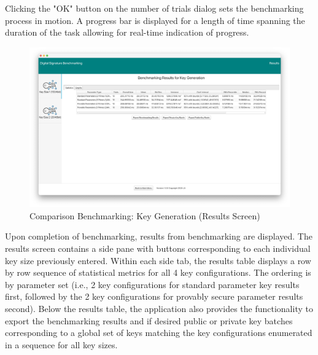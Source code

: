 \documentclass[]{final_report}
\begin{document}
Clicking the "OK" button on the number of trials dialog sets the benchmarking process in motion. A progress bar is displayed for a length of time spanning the duration of the task allowing for real-time indication of progress.


\begin{figure}[H]
    \centering
    \includegraphics[scale= 0.325]{main_pictures/ui/keyGen/keyGen4.png}
   \caption{Comparison Benchmarking: Key Generation (Results Screen)}
\end{figure}
Upon completion of benchmarking, results from benchmarking are displayed. The results screen contains a side pane with buttons corresponding to each individual key size previously entered. Within each side tab, the results table displays a row by row sequence of statistical metrics for all 4 key configurations.  The ordering is by parameter set (i.e., 2 key configurations for standard parameter key results first, followed by the 2 key configurations for provably secure parameter results second). Below the results table, the application also provides the functionality to export the benchmarking results and if desired public or private key batches corresponding to a global set of keys matching the key configurations enumerated in a sequence for all key sizes.
\end{document}
